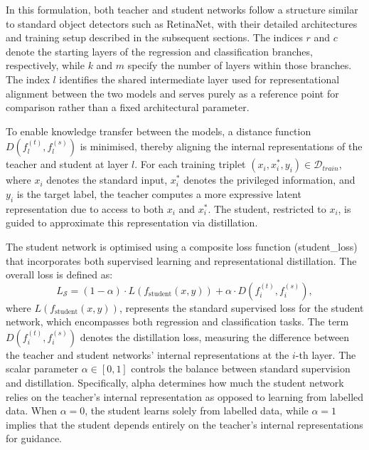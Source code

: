 In this formulation, both teacher and student networks follow a structure similar to standard object detectors such as RetinaNet, with their detailed architectures and training setup described in the subsequent sections. The indices \( r \) and \( c \) denote the starting layers of the regression and classification branches, respectively, while \( k \) and \( m \) specify the number of layers within those branches. The index \( l \) identifies the shared intermediate layer used for representational alignment between the two models and serves purely as a reference point for comparison rather than a fixed architectural parameter.


To enable knowledge transfer between the models, a distance function \( D(f_l^{(t)}, f_l^{(s)}) \) is minimised, thereby aligning the internal representations of the teacher and student at layer \( l \). For each training triplet \( (x_i, x_i^*, y_i) \in \mathcal{D}_{train} \), where \( x_i \) denotes the standard input, \( x_i^* \) denotes the privileged information, and \( y_i \) is the target label, the teacher computes a more expressive latent representation due to access to both \( x_i \) and \( x_i^* \). The student, restricted to \( x_i \), is guided to approximate this representation via distillation.

The student network is optimised using a composite loss function (\gls{student_loss}) that incorporates both supervised learning and representational distillation. The overall loss is defined as:
\begin{equation} \label{eq:lupi_loss_function}
L_{\mathcal{S}} = (1 - \alpha) \cdot L(f_{\text{student}}(x, y)) + \alpha \cdot D(f_i^{(t)}, f_i^{(s)}),
\end{equation}
where \( L(f_{\text{student}}(x, y)) \), represents the standard supervised loss for the student network, which encompasses both regression and classification tasks. The term \( D(f_i^{(t)}, f_i^{(s)}) \) denotes the distillation loss, measuring the difference between the teacher and student networks' internal representations at the \( i \)-th layer. The scalar parameter \( \alpha \in [0, 1] \) controls the balance between standard supervision and distillation. Specifically, \gls{alpha} determines how much the student network relies on the teacher’s internal representation as opposed to learning from labelled data. When \( \alpha = 0 \), the student learns solely from labelled data, while \( \alpha = 1 \) implies that the student depends entirely on the teacher's internal representations for guidance.

